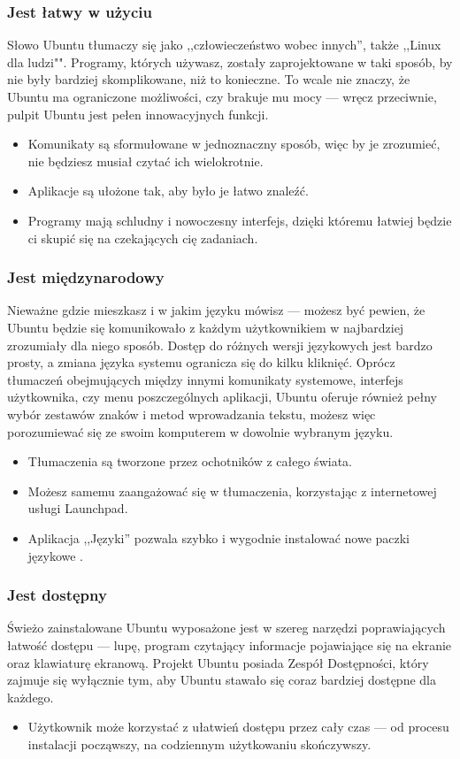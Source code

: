 \subsubsection{Jest łatwy w użyciu}
Słowo Ubuntu tłumaczy się jako ,,\textcolor{ubuntu_orange}{człowieczeństwo wobec innych}'',  także ,,Linux dla ludzi"". Programy, których używasz, zostały zaprojektowane w taki sposób, by nie były bardziej skomplikowane, niż to konieczne. To wcale nie znaczy, że Ubuntu ma ograniczone możliwości, czy brakuje mu mocy --- wręcz przeciwnie, pulpit Ubuntu jest pełen innowacyjnych funkcji.
\begin{itemize}
\item Komunikaty są sformułowane w jednoznaczny sposób, więc by je zrozumieć, nie będziesz musiał czytać ich wielokrotnie.
\item Aplikacje są ułożone tak, aby było je łatwo znaleźć.
\item Programy mają schludny i nowoczesny interfejs, dzięki któremu łatwiej będzie ci skupić się na czekających cię zadaniach.
\end{itemize}
\subsubsection{Jest międzynarodowy}
Nieważne gdzie mieszkasz i w jakim języku mówisz --- możesz być pewien, że Ubuntu będzie się komunikowało z każdym użytkownikiem w najbardziej zrozumiały dla niego sposób. Dostęp do różnych wersji językowych jest bardzo prosty, a zmiana języka systemu ogranicza się do kilku kliknięć.
Oprócz tłumaczeń obejmujących między innymi komunikaty systemowe, interfejs użytkownika, czy menu poszczególnych aplikacji, Ubuntu oferuje również pełny wybór zestawów znaków i metod wprowadzania tekstu, możesz więc porozumiewać się ze swoim komputerem w dowolnie wybranym języku.
\begin{itemize}
\item Tłumaczenia są tworzone przez ochotników z całego świata.
\item Możesz samemu zaangażować się w tłumaczenia, korzystając z internetowej usługi Launchpad.
\item Aplikacja ,,Języki'' pozwala szybko i wygodnie instalować nowe paczki językowe .
\end{itemize}
\subsubsection{Jest dostępny}
Świeżo zainstalowane Ubuntu wyposażone jest w szereg narzędzi poprawiających łatwość dostępu --- lupę, program czytający informacje pojawiające się na ekranie oraz klawiaturę ekranową. Projekt Ubuntu posiada Zespół Dostępności, który zajmuje się wyłącznie tym, aby Ubuntu stawało się coraz bardziej dostępne dla każdego.
\begin{itemize}
\item Użytkownik może korzystać z ułatwień dostępu przez cały czas --- od procesu instalacji począwszy, na codziennym użytkowaniu skończywszy.
\end{itemize}
